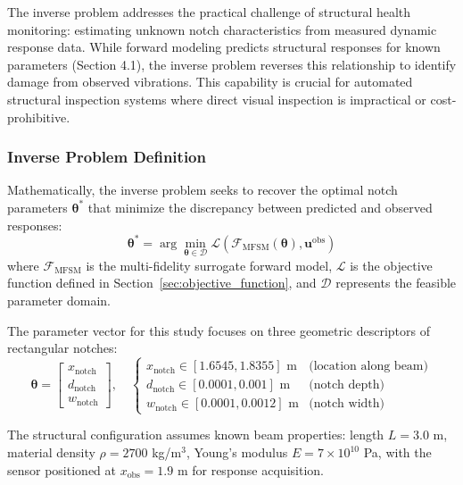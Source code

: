 \documentclass[12pt,a4paper]{report}
\begin{document}
The inverse problem addresses the practical challenge of structural health monitoring: estimating unknown notch characteristics from measured dynamic response data. While forward modeling predicts structural responses for known parameters (Section 4.1), the inverse problem reverses this relationship to identify damage from observed vibrations. This capability is crucial for automated structural inspection systems where direct visual inspection is impractical or cost-prohibitive.

\subsubsection{Inverse Problem Definition}
Mathematically, the inverse problem seeks to recover the optimal notch parameters $\boldsymbol{\theta}^*$ that minimize the discrepancy between predicted and observed responses:
\begin{equation}
\boldsymbol{\theta}^* = \arg\min_{\boldsymbol{\theta} \in \mathcal{D}} \mathcal{L}\left(\mathcal{F}_{\text{MFSM}}(\boldsymbol{\theta}), \mathbf{u}^{\text{obs}}\right)
\label{eq:inverse_optimization}
\end{equation}
where $\mathcal{F}_{\text{MFSM}}$ is the multi-fidelity surrogate forward model, $\mathcal{L}$ is the objective function defined in Section~\ref{sec:objective_function}, and $\mathcal{D}$ represents the feasible parameter domain.

The parameter vector for this study focuses on three geometric descriptors of rectangular notches:
\begin{equation}
\boldsymbol{\theta} = \begin{bmatrix}
x_{\text{notch}} \\ d_{\text{notch}} \\ w_{\text{notch}}
\end{bmatrix}, \quad
\begin{cases}
x_{\text{notch}} \in [1.6545, 1.8355] \text{ m} & \text{(location along beam)} \\
d_{\text{notch}} \in [0.0001, 0.001] \text{ m} & \text{(notch depth)} \\
w_{\text{notch}} \in [0.0001, 0.0012] \text{ m} & \text{(notch width)}
\end{cases}
\label{eq:parameter_bounds}
\end{equation}

The structural configuration assumes known beam properties: length $L = 3.0$ m, material density $\rho = 2700$ kg/m$^3$, Young's modulus $E = 7 \times 10^{10}$ Pa, with the sensor positioned at $x_{\text{obs}} = 1.9$ m for response acquisition.
\end{document}
